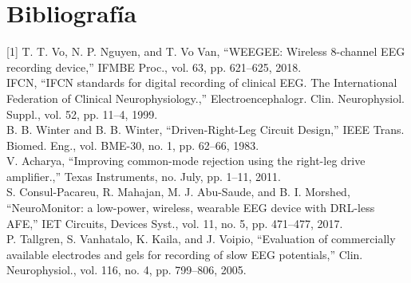 \section{Bibliografía}
\label{sec:org95c733c}
[1] T. T. Vo, N. P. Nguyen, and T. Vo Van, “WEEGEE: Wireless 8-channel EEG recording device,” IFMBE Proc., vol. 63, pp. 621–625, 2018.\\
[2] IFCN, “IFCN standards for digital recording of clinical EEG. The International Federation of Clinical Neurophysiology.,” Electroencephalogr. Clin. Neurophysiol. Suppl., vol. 52, pp. 11–4, 1999.\\
[3] B. B. Winter and B. B. Winter, “Driven-Right-Leg Circuit Design,” IEEE Trans. Biomed. Eng., vol. BME-30, no. 1, pp. 62–66, 1983.\\
[4] V. Acharya, “Improving common-mode rejection using the right-leg drive amplifier.,” Texas Instruments, no. July, pp. 1–11, 2011.\\
[5] S. Consul-Pacareu, R. Mahajan, M. J. Abu-Saude, and B. I. Morshed, “NeuroMonitor: a low-power, wireless, wearable EEG device with DRL-less AFE,” IET Circuits, Devices Syst., vol. 11, no. 5, pp. 471–477, 2017.\\
[6] P. Tallgren, S. Vanhatalo, K. Kaila, and J. Voipio, “Evaluation of commercially available electrodes and gels for recording of slow EEG potentials,” Clin. Neurophysiol., vol. 116, no. 4, pp. 799–806, 2005.\\

